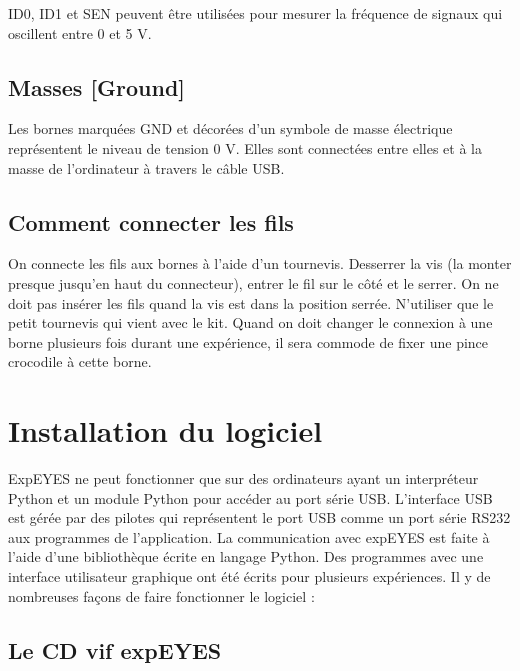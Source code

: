 \documentclass{book}
\begin{document}
ID0, ID1 et SEN peuvent être utilisées pour mesurer la fréquence de signaux qui oscillent entre 0 et 5 V.




\subsection{Masses [Ground]}





Les bornes marquées GND et décorées d'un symbole de masse électrique représentent le niveau de tension 0 V. Elles sont connectées entre elles et à la masse de l'ordinateur à travers le câble USB.




\subsection{Comment connecter les fils}





On connecte les fils aux bornes à l'aide d'un tournevis. Desserrer la vis (la monter presque jusqu'en haut du connecteur), entrer le fil sur le côté et le serrer. On ne doit pas insérer les fils quand la vis est dans la position serrée. N'utiliser que le petit tournevis qui vient avec le kit. Quand on doit changer le connexion à une borne plusieurs fois durant une expérience, il sera commode de fixer une pince crocodile à cette borne.




\section{Installation du logiciel}





ExpEYES ne peut fonctionner que sur des ordinateurs ayant un interpréteur Python et un module Python pour accéder au port série USB. L'interface USB est gérée par des pilotes qui représentent le port USB comme un port série RS232 aux programmes de l'application. La communication avec expEYES est faite à l'aide d'une bibliothèque écrite en langage Python. Des programmes avec une interface utilisateur graphique ont été écrits pour plusieurs expériences. Il y de nombreuses façons de faire fonctionner le logiciel :




\subsection{Le CD vif expEYES}
\end{document}
